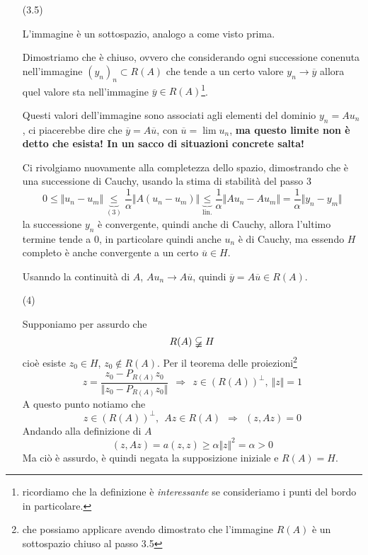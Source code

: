 \documentclass[10pt,a4paper,twoside,openright]{book}
\begin{document}
\begin{dimostrazione}
\begin{itemize}
\item[(3.5)]

L'immagine è un sottospazio, analogo a come visto prima.

Dimostriamo che è chiuso, ovvero che considerando ogni successione conenuta nell'immagine $(y_{n})_{n} \subset R(A)$ che tende a un certo valore $y_{n}\rightarrow \overline{y}$ allora quel valore sta nell'immagine $\overline{y} \in R(A)$\footnote{ricordiamo che la definizione è \textit{interessante} se consideriamo i punti del bordo in particolare.}.

Questi valori dell'immagine sono associati agli elementi del dominio $y_{n} =Au_{n}$, ci piacerebbe dire che $\overline{y} =A\overline{u}$, con $\overline{u} =\lim u_{n}$, \textbf{ma questo limite non è detto che esista! In un sacco di situazioni concrete salta!}

Ci rivolgiamo nuovamente alla completezza dello spazio, dimostrando che è una successione di Cauchy, usando la stima di stabilità del passo 3
\begin{equation*}
0\leqslant \Vert u_{n} -u_{m}\Vert \underbrace{\leqslant }_{(3)}\frac{1}{\alpha }\Vert A(u_{n} -u_{m})\Vert \underbrace{\leqslant }_{\text{lin.}}\frac{1}{\alpha }\Vert Au_{n} -Au_{m}\Vert =\frac{1}{\alpha }\Vert y_{n} -y_{m}\Vert 
\end{equation*}
la successione $y_{n}$ è convergente, quindi anche di Cauchy, allora l'ultimo termine tende a $0$, in particolare quindi anche $u_{n}$ è di Cauchy, ma essendo $H$ completo è anche convergente a un certo $\overline{u} \in H$.

Usanndo la continuità di $A$, $Au_{n}\rightarrow A\overline{u}$, quindi $\overline{y} =A\overline{u} \in R(A)$.



\item[(4)]

Supponiamo per assurdo che
\begin{equation*}
R(A) \varsubsetneqq H
\end{equation*}
cioè esiste $z_{0} \in H$, $z_{0} \notin R(A)$. Per il teorema delle proiezioni\footnote{che possiamo applicare avendo dimostrato che l'immagine $R(A)$ è un sottospazio chiuso al passo 3.5}
\begin{equation*}
z=\frac{z_{0} -P_{R(A)} z_{0}}{\Vert z_{0} -P_{R(A)} z_{0}\Vert } \ \ \Rightarrow \ \ z\in (R(A))^{\perp },\ \Vert z\Vert =1
\end{equation*}
A questo punto notiamo che
\begin{equation*}
z\in (R(A))^{\perp },\ \ Az\in R(A) \ \ \Rightarrow \ \ (z,Az) =0
\end{equation*}
Andando alla definizione di $A$
\begin{equation*}
(z,Az) =a(z,z) \geqslant \alpha \Vert z\Vert ^{2} =\alpha  >0
\end{equation*}
Ma ciò è assurdo, è quindi negata la supposizione iniziale e $R(A) =H$.
\end{itemize}
\end{dimostrazione}
\end{document}
